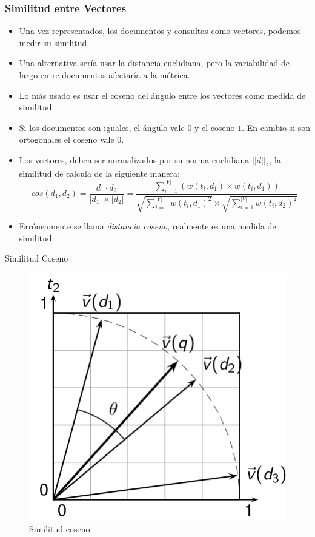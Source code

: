 \documentclass[handout]{beamer}
\begin{document}
\begin{frame}\frametitle{Similitud entre Vectores}
\footnotesize{
\begin{itemize}
 \item Una vez representados, los documentos y consultas como vectores, podemos medir su similitud.
 \item Una alternativa sería usar la distancia euclidiana, pero la variabilidad de largo entre documentos afectaría a la métrica.
 \item Lo más usado es usar el coseno del ángulo entre los vectores como medida de similitud.
 \item Si los documentos son iguales, el ángulo vale $0$ y el coseno $1$. En cambio si son ortogonales el coseno vale $0$.
 \item Los vectores, deben ser normalizados por su norma euclidiana $||d||_{2}$, la similitud de calcula de la siguiente manera:  
 \begin{displaymath}
 cos(d_{1},d_{2})= \frac{d_{1}\cdot d_{2}}{|d_{1}|\times|d_{2}|} = \frac{\sum_{i=1}^{|V|}(w(t_{i},d_{1})\times w(t_{i},d_{1}))}{\sqrt{\sum_{i=1}^{|V|} w(t_{i},d_{1})^2}\times \sqrt{\sum_{i=1}^{|V|} w(t_{i},d_{2})^2}}
\end{displaymath}
\item Erróneamente se llama \emph{distancia coseno}, realmente es una medida de similitud.


\end{itemize}


}
\end{frame}

\begin{frame}{Similitud Coseno}

\begin{figure}[h!]
	\centering
	\includegraphics[scale=0.5]{pics/cos.png}
	\caption{ Similitud coseno.}
\end{figure}

\end{frame}
\end{document}
